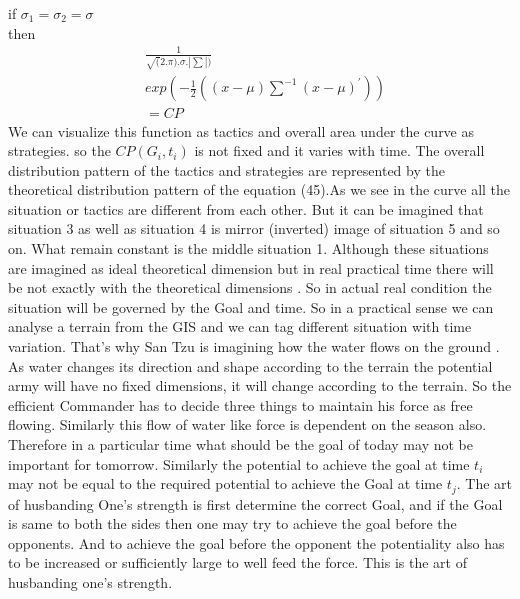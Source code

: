 \documentclass[]{article}
\begin{document}
if $\sigma_1=\sigma_2=\sigma$\\
then\\
\begin{equation}
\begin{split}
  &\frac{1}{\sqrt(2.\pi).\sigma.|\sum|)}\\&exp(-\frac{1}{2}((x-\mu){{\sum^{-1}}}(x-\mu)^{'} ))\\&=CP  
\end{split} 
\end{equation}
We can visualize this function as tactics and overall area under the curve as strategies. so the $CP(G_i,t_i)$ is not fixed and it varies with time. The overall distribution pattern of the tactics and strategies are represented by the theoretical distribution pattern of the equation (45).As we see in the curve all the situation or tactics are different from each other. But it can be imagined that situation 3 as well as situation 4 is mirror (inverted) image of situation 5 and so on. What remain constant is the middle situation 1. Although these situations are imagined as ideal theoretical dimension but in real practical time there will be not exactly with the theoretical dimensions . So in actual real condition the situation will be governed by the Goal and time. So in a practical sense we can analyse a terrain from the GIS and we can tag different situation with time variation. That's why San Tzu is imagining how the water flows on the ground . As water changes its direction and shape according to the terrain the potential army will have no fixed dimensions, it will change according to the terrain. So the efficient Commander has to decide three things to maintain his force as free flowing. 
Similarly this flow of water like force is dependent on the season also. Therefore in a particular time what should be the goal of today may not be important for tomorrow. Similarly the potential to achieve the goal at time $t_i$ may not be equal to the required potential to achieve the Goal at time $t_j$. The art of husbanding One's strength is first determine the correct Goal, and if the Goal is same to both the sides then one may try to achieve the goal before the opponents. And to achieve the goal before the opponent the potentiality also has to be increased or sufficiently large to well feed the force. This is the art of husbanding one's strength.
\end{document}
